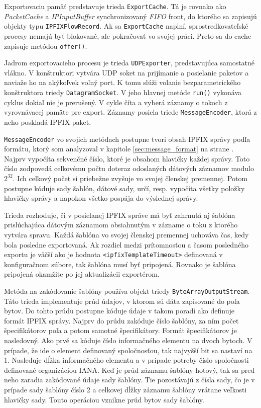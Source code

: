 Exportovaciu pamäť predstavuje trieda \verb|ExportCache|. Tá je rovnako ako \emph{PacketCache} a 
\emph{IPInputBuffer} synchronizovaný \emph{FIFO} front, do ktorého sa zapisujú objekty typu 
\verb|IPFIXFlowRecord|. Ak sa \verb|ExportCache| naplní, sprostredkovateľské procesy nemajú byť blokované, 
ale pokračovať vo svojej práci. Preto sa do cache zapisuje metódou \verb|offer()|.

Jadrom exportovacieho procesu je trieda \verb|UDPExporter|, predstavujúca samostatné vlákno. V 
konštruktori vytvára UDP soket na prijímanie a posielanie paketov a naviaže ho na akýkoľvek voľný port.
K tomu slúži volanie bezparametrického konštruktora triedy \verb|DatagramSocket|. V jeho hlavnej metóde 
\verb|run()| vykonáva cyklus dokiaľ nie je prerušený. V cykle číta a vyberá záznamy o tokoch z 
vyrovnávacej pamäte pre export. Záznamy posiela triede \verb|MessageEncoder|, ktorá z neho poskladá 
IPFIX paket.

\verb|MessageEncoder| vo svojich metódach postupne tvori obsah IPFIX správy podľa formátu, ktorý som 
analyzoval v kapitole \ref{sec:message_format} na strane \pageref{sec:message_format}. Najprv vypočíta 
sekvenčné číslo, ktoré je obsahom hlavičky každej správy. Toto číslo zodpovedá celkovému počtu doteraz 
odoslaných dátových záznamov modulo $2^{32}$. Ich celkový počet si priebežne zvyšuje vo svojej členskej 
premennej. Potom postupne kóduje sady šablón, dátové sady, určí, resp. vypočíta všetky položky 
hlavičky správy a napokon všetko pospája do výslednej správy.

Trieda rozhoduje, či v posielanej IPFIX správe má byť zahrnutá aj šablóna prislúchajúca dátovým záznamom
obsiahnutým v zázname o toku z ktorého vytvára spravu. Každá šablóna vo svojej členskej premennej uchováva
čas, kedy bola posledne exportovaná. Ak rozdiel medzi prítomnosťou a časom posledného exportu je väčší ako 
je hodnota \verb|<ipfixTemplateTimeout>| definovaná v konfiguračnom súbore, tak šablóna musí byť pripojená.
Rovnako je šablóna pripojená okamžite po jej aktualizácii exportérom. 

Metóda na zakódovanie šablóny používa objekt triedy \verb|ByteArrayOutputStream|. Táto trieda 
implementuje prúd údajov, v ktorom sú dáta zapisované do poľa bytov. Do tohto prúdu postupne kóduje údaje 
v takom poradí ako definuje formát IPFIX správy. Najprv do prúdu zakóduje číslo šablóny, za ním 
počet špecifikátorov poľa a potom samotné špecifikátory. Formát špecifikátorov je nasledovný. Ako prvé sa 
kóduje číslo informačného elementu na dvoch bytoch. V prípade, že ide o element definovaný 
spoločnosťou, tak najvyšší bit sa nastaví na 1. Nasleduje dĺžka informačného elementu a v prípade potreby 
číslo spoločnosti definované organizáciou IANA. Keď je prúd záznamu šablóny hotový, tak sa pred neho 
zaradia zakódované údaje sady šablóny. Tie pozostávajú z čísla sady, čo je v prípade sady šablóny číslo 2
a celkovej dĺžky záznamu šablóny 
vrátane veľkosti hlavičky sady. Touto operáciou vznikne prúd bytov sady šablóny.

